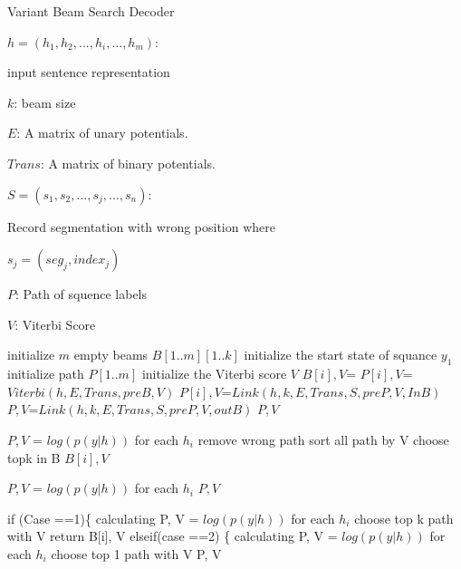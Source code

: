 \documentclass[conference]{IEEEtran}
\begin{document}
\begin{algorithm}  
\caption{Variant Beam Search Decoder}  
\label{alg:A}  
\begin{algorithmic}[1] 

\Require 
\qquad 



$h = (h_1, h_2,..., h_i,..., h_m)$: 

input sentence representation 

$k$: beam size 

$E$: A matrix of unary potentials.

$Trans$: A matrix of binary potentials.

 

$S= (s_1,s_2,...,s_j,...,s_n) $: 

Record segmentation with wrong position
where 

$s_j=(seg_j, index_j)$
\Ensure 
\qquad 

$P$: Path of squence labels 

$V$: Viterbi Score 

\State initialize $m$ empty beams $B[1..m][1..k]$
\State initialize the start state of squance $y_1$
\State initialize path $P[1..m]$
\State initialize the Viterbi score $V$
		\State $B[i], V$=
		\State $P[i], V$=$Viterbi(h,E, Trans,preB,V)$
		\State $P[i], V$=$Link(h,k,E,Trans,S,preP,V,InB)$
		\State  $P, V$=$Link(h,k,E,Trans,S, preP,V,outB)$
	\EndIf
\EndFor
\State \Return $P, V$
\EndFunction

\State $P, V$ = $log(p(y|h))$ for each $h_i$
\State remove wrong path
\State sort all path by V
\State choose topk in B	
\State \Return $B[i],V$
\EndFunction

	  \State $P, V$ = $log(p(y|h))$ for each $h_i$
	  \State \Return $P, V$
\EndFunction

	\State if (Case ==1)\{   
	\State calculating P, V = $log(p(y|h))$ for each $h_i$
	\State choose top k path with V
	\State return B[i], V
	\State elseif(case ==2) \{
	\State calculating P, V = $log(p(y|h))$ for each $h_i$
	\State choose top 1 path with V
	\State \Return P, V 
\EndFunction

\end{algorithmic}
\end{algorithm}
\end{document}
